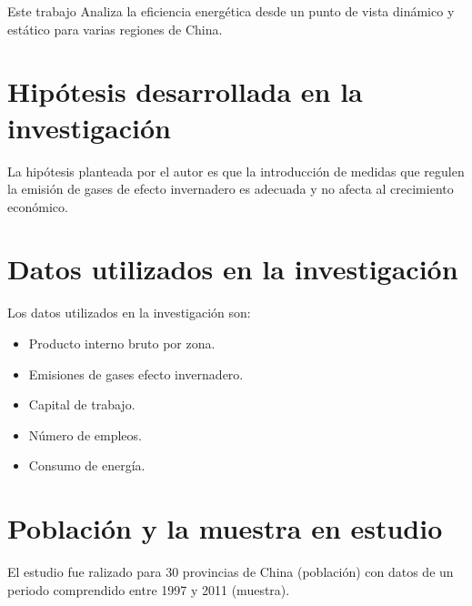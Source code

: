 \documentclass{article}
\begin{document}
Este trabajo Analiza la eficiencia energética desde un punto de vista dinámico y estático para varias regiones de China.

\section{Hipótesis desarrollada en la investigación}

La hipótesis planteada por el autor es que la introducción de medidas que regulen la emisión de gases de efecto invernadero es adecuada y no afecta al crecimiento económico.

\section{Datos utilizados en la investigación}

Los datos utilizados en la investigación son:

\begin{itemize}
    \item Producto interno bruto por zona.
    \item Emisiones de gases efecto invernadero.
    \item Capital de trabajo.
    \item Número de empleos.
    \item Consumo de energía.
\end{itemize}

\section{Población y la muestra en estudio}

El estudio fue ralizado para 30 provincias de China (población) con datos de un periodo comprendido entre 1997 y 2011 (muestra). 
\nocite{*}
    
\end{document}

